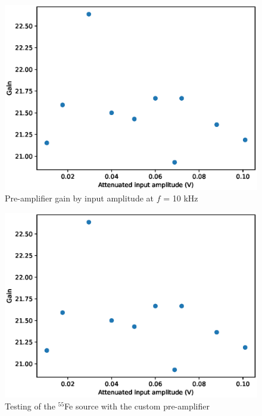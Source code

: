 \documentclass[a4paper]{article}
\begin{document}
\begin{appendices}
\begin{figure}[ht!]
\centering
\includegraphics[width=\textwidth]{fig/python/preamp_gain}
\caption{Pre-amplifier gain by input amplitude at $f$ = 10 kHz}
\label{fig:attenuator}
\end{figure}


\begin{figure}[ht!]
\centering
\includegraphics[width=\textwidth]{fig/python/preamp_gain}
\caption{Testing of the $^{55}$Fe source with the custom pre-amplifier}
\label{fig:pre_amp_testing}
\end{figure}


\end{appendices}


\clearpage
\printbibliography
\end{document}
